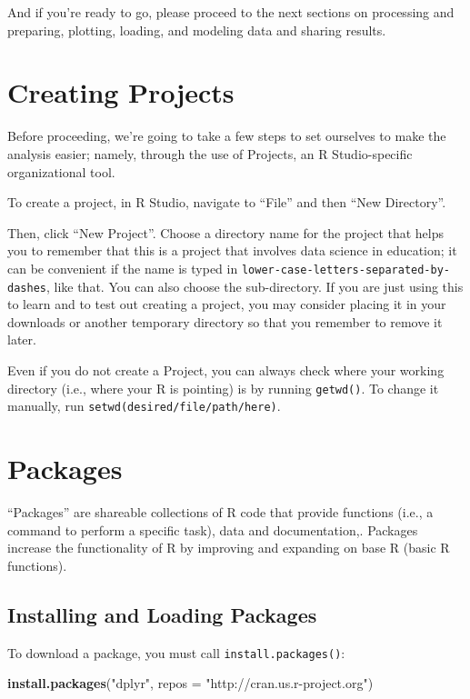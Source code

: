 \documentclass[]{book}
\newenvironment{Shaded}{\begin{snugshade}}{\end{snugshade}}
\newcommand{\KeywordTok}[1]{\textcolor[rgb]{0.13,0.29,0.53}{\textbf{#1}}}
\newcommand{\DataTypeTok}[1]{\textcolor[rgb]{0.13,0.29,0.53}{#1}}
\newcommand{\StringTok}[1]{\textcolor[rgb]{0.31,0.60,0.02}{#1}}
\newcommand{\NormalTok}[1]{#1}
\begin{document}
And if you're ready to go, please proceed to the next sections on
processing and preparing, plotting, loading, and modeling data and
sharing results.

\section{Creating Projects}\label{creating-projects}

Before proceeding, we're going to take a few steps to set ourselves to
make the analysis easier; namely, through the use of Projects, an R
Studio-specific organizational tool.

To create a project, in R Studio, navigate to ``File'' and then ``New
Directory''.

Then, click ``New Project''. Choose a directory name for the project
that helps you to remember that this is a project that involves data
science in education; it can be convenient if the name is typed in
\texttt{lower-case-letters-separated-by-dashes}, like that. You can also
choose the sub-directory. If you are just using this to learn and to
test out creating a project, you may consider placing it in your
downloads or another temporary directory so that you remember to remove
it later.

Even if you do not create a Project, you can always check where your
working directory (i.e., where your R is pointing) is by running
\texttt{getwd()}. To change it manually, run
\texttt{setwd(desired/file/path/here)}.

\section{Packages}\label{packages}

``Packages'' are shareable collections of R code that provide functions
(i.e., a command to perform a specific task), data and documentation,.
Packages increase the functionality of R by improving and expanding on
base R (basic R functions).

\subsection{Installing and Loading
Packages}\label{installing-and-loading-packages}

To download a package, you must call \texttt{install.packages()}:

\begin{Shaded}
\begin{Highlighting}[]
\KeywordTok{install.packages}\NormalTok{(}\StringTok{"dplyr"}\NormalTok{, }\DataTypeTok{repos =} \StringTok{"http://cran.us.r-project.org"}\NormalTok{)}
\end{Highlighting}
\end{Shaded}
\end{document}
